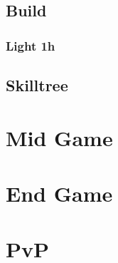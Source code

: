 \documentclass[14pt]{article}
\begin{document}
\subsection{Build}
\subsubsection{Light 1h}
\subsection{Skilltree}


\newpage

\section{Mid Game}
\newpage
\section{End Game}
\newpage
\section{PvP}
\newpage
\end{document}
